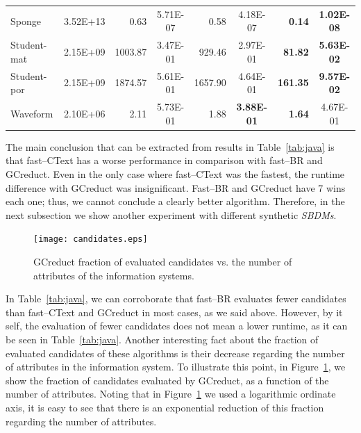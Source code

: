 \documentclass[number,preprint,review,12pt]{elsarticle}
\begin{document}
\begin{table}[!htb]
\begin{tabular}{|l|c|r|c|r|c|r|c|}
			Sponge           & 3.52E+13 & 0.63          & 5.71E-07 & 0.58             & 4.18E-07          & \textbf{0.14}   & \textbf{1.02E-08} \\
 			Student-mat      & 2.15E+09 & 1003.87       & 3.47E-01 & 929.46           & 2.97E-01          & \textbf{81.82}  & \textbf{5.63E-02} \\
			Student-por      & 2.15E+09 & 1874.57       & 5.61E-01 & 1657.90          & 4.64E-01          & \textbf{161.35} & \textbf{9.57E-02} \\
			Waveform         & 2.10E+06 & 2.11          & 5.73E-01 & 1.88             & \textbf{3.88E-01} & \textbf{1.64}   & 4.67E-01          \\
			\hline
		\end{tabular}
	\end{table}

    The main conclusion that can be extracted from results in Table~\ref{tab:java} is that fast--CText has a worse performance in comparison with fast--BR and GCreduct. Even in the only case where fast--CText was the fastest, the runtime difference with GCreduct was insignificant. Fast--BR and GCreduct have 7 wins each one; thus, we cannot conclude a clearly better algorithm. Therefore, in the next subsection we show another experiment with different synthetic \textit{SBDMs}.
					
	\begin{figure}[htb]
		\begin{center}
			\texttt{[image: candidates.eps]}
		\end{center}
		\caption{GCreduct fraction of evaluated candidates vs. the number of attributes of the information systems.}
		\label{fig:candidates}
	\end{figure}	

	In Table~\ref{tab:java}, we can corroborate that fast--BR evaluates fewer candidates than fast--CText and GCreduct in most cases, as we said above. However, by it self, the evaluation of fewer candidates does not mean a lower runtime, as it can be seen in Table~\ref{tab:java}. Another interesting fact about the fraction of evaluated candidates of these algorithms is their decrease regarding the number of attributes in the information system. To illustrate this point, in Figure~\ref{fig:candidates}, we show the fraction of candidates evaluated by GCreduct, as a function of the number of attributes. Noting that in Figure~\ref{fig:candidates} we used a logarithmic ordinate axis, it is easy to see that there is an exponential reduction of this fraction regarding the number of attributes.	\label{par:brutal}
		
\end{document}
